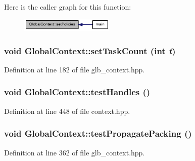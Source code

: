 Here is the caller graph for this function:\nopagebreak
\begin{figure}[H]
\begin{center}
\leavevmode
\includegraphics[width=126pt]{class_global_context_a764ed43467db5334719f4bfdddc4dc6b_icgraph}
\end{center}
\end{figure}
\hypertarget{class_global_context_a7d41742f16955cf6a007a95797fa52ac}{
\subsubsection[{setTaskCount}]{\setlength{\rightskip}{0pt plus 5cm}void GlobalContext::setTaskCount (int {\em t})}}
\label{class_global_context_a7d41742f16955cf6a007a95797fa52ac}


Definition at line 182 of file glb\_\-context.hpp.\hypertarget{class_global_context_aeb21e846898eaf2a7ec28ded66cf4d17}{
\subsubsection[{testHandles}]{\setlength{\rightskip}{0pt plus 5cm}void GlobalContext::testHandles ()}}
\label{class_global_context_aeb21e846898eaf2a7ec28ded66cf4d17}


Definition at line 448 of file context.hpp.\hypertarget{class_global_context_a45180bd1ced20471a3489200c235ed37}{
\subsubsection[{testPropagatePacking}]{\setlength{\rightskip}{0pt plus 5cm}void GlobalContext::testPropagatePacking ()}}
\label{class_global_context_a45180bd1ced20471a3489200c235ed37}


Definition at line 362 of file glb\_\-context.hpp.

